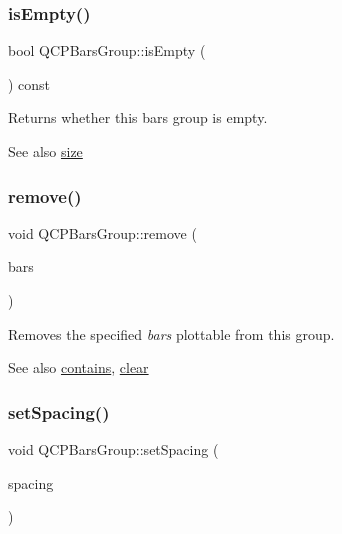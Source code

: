 \subsubsection{\texorpdfstring{is\+Empty()}{isEmpty()}}
{\footnotesize\ttfamily bool Q\+C\+P\+Bars\+Group\+::is\+Empty (\begin{DoxyParamCaption}{ }\end{DoxyParamCaption}) const\hspace{0.3cm}{\ttfamily [inline]}}

Returns whether this bars group is empty.

\begin{DoxySeeAlso}{See also}
\hyperlink{classQCPBarsGroup_a3780ec77919cb00840207ec7a0f00dd5}{size} 
\end{DoxySeeAlso}
\mbox{\label{classQCPBarsGroup_a215e28a5944f1159013a0e19169220e7}} 
\subsubsection{\texorpdfstring{remove()}{remove()}}
{\footnotesize\ttfamily void Q\+C\+P\+Bars\+Group\+::remove (\begin{DoxyParamCaption}\item[{\hyperlink{classQCPBars}{Q\+C\+P\+Bars} $\ast$}]{bars }\end{DoxyParamCaption})}

Removes the specified {\itshape bars} plottable from this group.

\begin{DoxySeeAlso}{See also}
\hyperlink{classQCPBarsGroup_ae26da07a23553052a178fb3fae90d0dc}{contains}, \hyperlink{classQCPBarsGroup_a3ddf23928c6cd89530bd34ab7ba7b177}{clear} 
\end{DoxySeeAlso}
\mbox{\label{classQCPBarsGroup_aa553d327479d72a0c3dafcc724a190e2}} 
\subsubsection{\texorpdfstring{set\+Spacing()}{setSpacing()}}
{\footnotesize\ttfamily void Q\+C\+P\+Bars\+Group\+::set\+Spacing (\begin{DoxyParamCaption}\item[{double}]{spacing }\end{DoxyParamCaption})}

